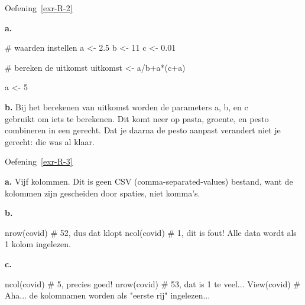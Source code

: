 \documentclass[
  a4paper,
]{scrbook}
\newenvironment{Shaded}{\begin{snugshade}}{\end{snugshade}}
\newcommand{\CommentTok}[1]{\textcolor[rgb]{0.37,0.37,0.37}{#1}}
\newcommand{\DecValTok}[1]{\textcolor[rgb]{0.68,0.00,0.00}{#1}}
\newcommand{\FloatTok}[1]{\textcolor[rgb]{0.68,0.00,0.00}{#1}}
\newcommand{\FunctionTok}[1]{\textcolor[rgb]{0.28,0.35,0.67}{#1}}
\newcommand{\NormalTok}[1]{\textcolor[rgb]{0.00,0.23,0.31}{#1}}
\newcommand{\OtherTok}[1]{\textcolor[rgb]{0.00,0.23,0.31}{#1}}
\newcommand{\SpecialCharTok}[1]{\textcolor[rgb]{0.37,0.37,0.37}{#1}}
\theoremstyle{definition}
\theoremstyle{remark}
\begin{document}
Oefening~\ref{exr-R-2}

\textbf{a.}

\begin{Shaded}
\begin{Highlighting}[]
\CommentTok{\# waarden instellen}
\NormalTok{a }\OtherTok{\textless{}{-}} \FloatTok{2.5}
\NormalTok{b }\OtherTok{\textless{}{-}} \DecValTok{11}
\NormalTok{c }\OtherTok{\textless{}{-}} \FloatTok{0.01}

\CommentTok{\# bereken de uitkomst}
\NormalTok{uitkomst }\OtherTok{\textless{}{-}}\NormalTok{ a}\SpecialCharTok{/}\NormalTok{b}\SpecialCharTok{+}\NormalTok{a}\SpecialCharTok{*}\NormalTok{(c}\SpecialCharTok{+}\NormalTok{a)}

\NormalTok{a }\OtherTok{\textless{}{-}} \DecValTok{5}
\end{Highlighting}
\end{Shaded}

\textbf{b.} Bij het berekenen van uitkomst worden de parameters a, b, en
c\\
gebruikt om iets te berekenen. Dit komt neer op pasta, groente, en pesto
combineren in een gerecht. Dat je daarna de pesto aanpast verandert niet
je gerecht: die was al klaar.

Oefening~\ref{exr-R-3}

\textbf{a.} Vijf kolommen. Dit is geen CSV (comma-separated-values)
bestand, want de kolommen zijn gescheiden door spaties, niet komma's.

\textbf{b.}

\begin{Shaded}
\begin{Highlighting}[]
\FunctionTok{nrow}\NormalTok{(covid) }\CommentTok{\# 52, dus dat klopt}
\FunctionTok{ncol}\NormalTok{(covid) }\CommentTok{\# 1, dit is fout! Alle data wordt als 1 kolom ingelezen.}
\end{Highlighting}
\end{Shaded}

\textbf{c.}

\begin{Shaded}
\begin{Highlighting}[]
\FunctionTok{ncol}\NormalTok{(covid) }\CommentTok{\# 5, precies goed!}
\FunctionTok{nrow}\NormalTok{(covid) }\CommentTok{\# 53, dat is 1 te veel... }
\FunctionTok{View}\NormalTok{(covid) }\CommentTok{\# Aha... de kolomnamen worden als "eerste rij" ingelezen...}
\end{Highlighting}
\end{Shaded}
\end{document}
